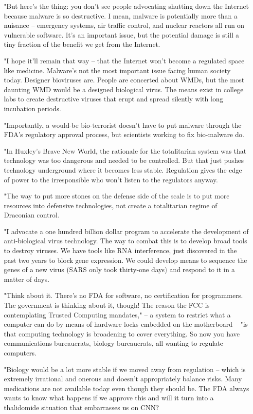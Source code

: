 "But here's the thing: you don't see people advocating shutting
down the Internet because malware is so destructive. I mean,
malware is potentially more than a nuisance -- emergency systems,
air traffic control, and nuclear reactors all run on vulnerable
software. It's an important issue, but the potential damage is
still a tiny fraction of the benefit we get from the Internet.

"I hope it'll remain that way -- that the Internet won't become a
regulated space like medicine. Malware's not the most important
issue facing human society today. Designer bioviruses are. People
are concerted about WMDs, but the most daunting WMD would be a
designed biological virus. The means exist in college labs to
create destructive viruses that erupt and spread silently with long
incubation periods.

"Importantly, a would-be bio-terrorist doesn't have to put malware
through the FDA's regulatory approval process, but scientists
working to fix bio-malware do.

"In Huxley's Brave New World, the rationale for the totalitarian
system was that technology was too dangerous and needed to be
controlled. But that just pushes technology underground where it
becomes less stable. Regulation gives the edge of power to the
irresponsible who won't listen to the regulators anyway.

"The way to put more stones on the defense side of the scale is to
put more resources into defensive technologies, not create a
totalitarian regime of Draconian control.

"I advocate a one hundred billion dollar program to accelerate the
development of anti-biological virus technology. The way to combat
this is to develop broad tools to destroy viruses. We have tools
like RNA interference, just discovered in the past two years to
block gene expression. We could develop means to sequence the genes
of a new virus (SARS only took thirty-one days) and respond to it
in a matter of days.

"Think about it. There's no FDA for software, no certification for
programmers. The government is thinking about it, though! The
reason the FCC is contemplating Trusted Computing mandates," -- a
system to restrict what a computer can do by means of hardware
locks embedded on the motherboard -- "is that computing technology
is broadening to cover everything. So now you have communications
bureaucrats, biology bureaucrats, all wanting to regulate
computers.

"Biology would be a lot more stable if we moved away from
regulation -- which is extremely irrational and onerous and doesn't
appropriately balance risks. Many medications are not available
today even though they should be. The FDA always wants to know what
happens if we approve this and will it turn into a thalidomide
situation that embarrasses us on CNN?

